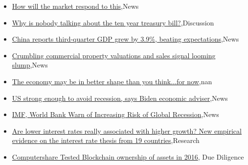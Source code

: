 \documentclass{article}%
\begin{document}
%
\begin{itemize}%
\item%
\href{https://reddit.com/r/wallstreetbets/comments/ybzt7t/how\_will\_the\_market\_respond\_to\_this/}{How will the market respond to this},News%
\item%
\href{https://reddit.com/r/StockMarket/comments/ybwl34/why\_is\_nobody\_talking\_about\_the\_ten\_year\_treasury/}{Why is nobody talking about the ten year treasury bill?},Discussion%
\item%
\href{https://reddit.com/r/Economics/comments/ybz5mc/china\_reports\_thirdquarter\_gdp\_grew\_by\_39\_beating/}{China reports third-quarter GDP grew by 3.9\%, beating expectations},News%
\item%
\href{https://reddit.com/r/Economics/comments/ybwkjz/crumbling\_commercial\_property\_valuations\_and/}{Crumbling commercial property valuations and sales signal looming slump},News%
\item%
\href{https://reddit.com/r/Economics/comments/ybv3p8/the\_economy\_may\_be\_in\_better\_shape\_than\_you/}{The economy may be in better shape than you think...for now},nan%
\item%
\href{https://reddit.com/r/Economics/comments/ybpmm6/us\_strong\_enough\_to\_avoid\_recession\_says\_biden/}{US strong enough to avoid recession, says Biden economic adviser},News%
\item%
\href{https://reddit.com/r/Economics/comments/ybo4vp/imf\_world\_bank\_warn\_of\_increasing\_risk\_of\_global/}{IMF, World Bank Warn of Increasing Risk of Global Recession},News%
\item%
\href{https://reddit.com/r/Economics/comments/ybdfx1/are\_lower\_interest\_rates\_really\_associated\_with/}{Are lower interest rates really associated with higher growth? New empirical evidence on the interest rate thesis from 19 countries},Research%
\item%
\href{https://reddit.com/r/Superstonk/comments/ybyu9p/computershare\_tested\_blockchain\_ownership\_of/}{Computershare Tested Blockchain ownership of assets in 2016}, Due Diligence%
\end{itemize}%
\end{document}
